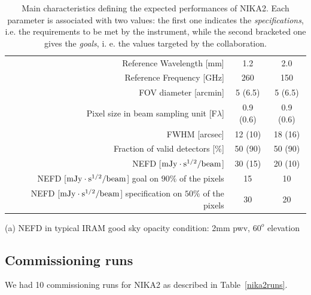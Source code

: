 \documentclass[a4paper, 11pt]{article} %
\begin{document}
\begin{table}[h]
\caption{Main characteristics defining the expected performances of NIKA2. Each parameter is associated with two values: the first one indicates the \emph{specifications}, i.e. the requirements to be met by the instrument, while the second bracketed one gives the \emph{goals}, i. e. the values targeted by the collaboration.}
\label{nika2specs}
\begin{threeparttable}
\begin{tabular}{|r|c|c|}
  \hline
  \hline
Reference Wavelength  [mm]  &  1.2 & 2.0  \\
Reference Frequency  [GHz]  &  260 & 150  \\
\hline  
\hline
FOV diameter [arcmin]       &  5 (6.5)    &  5 (6.5)   \\
Pixel size in beam sampling unit [F$\lambda$]  &  0.9 (0.6)   &   0.9 (0.6)  \\
FWHM  [arcsec]              &  12 (10)   &  18 (16) \\
Fraction of valid detectors [$\%$] &  50 (90)   &  50 (90) \\
NEFD\tnote{a}\hspace{1mm}   [$\rm{mJy} \cdot \rm{s}^{1/2}/\rm{beam}$]  &  30 (15)   &  20 (10) \\
\hline
NEFD [$\rm{mJy} \cdot \rm{s}^{1/2}/\rm{beam}$] goal on $90\%$ of the pixels  &  15  & 10 \\
NEFD [$\rm{mJy} \cdot \rm{s}^{1/2}/\rm{beam}$] specification on $50\%$ of the pixels  &  30  &  20  \\
\hline
\end{tabular}
\begin{tablenotes}
  \item[(a)] NEFD in typical IRAM good sky opacity condition: 2mm pwv, $60^o$ elevation
\end{tablenotes}
\end{threeparttable}
\end{table} 


\subsection{Commissioning runs}
We had 10 commissioning runs for NIKA2 as described in Table~\ref{nika2runs}.
\end{document}
